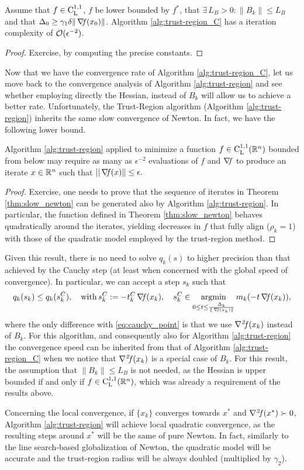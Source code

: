 \documentclass[10pt,a4paper]{article}
\begin{document}
\begin{theorem}
	Assume that $f\in \mathord{\mathrm{C^{1,1}_{L}}}$, $f$ be lower bounded by $f^*$, that $\exists\, L_B>0: \|B_k\| \leq L_B$ and that $\Delta_0\geq \gamma_1 \delta \|\operatorname*{\mathit{\nabla \!f}}(x_0)\|$. Algorithm \ref{alg:trust-region_C} has a iteration complexity of $\mathcal{O}(\epsilon^{-2})$.
\end{theorem}
\begin{proof}
	Exercise, by computing the precise constants.
\end{proof}
Now that we have the convergence rate of Algorithm \ref{alg:trust-region_C}, let us move back to the convergence analysis of Algorithm \ref{alg:trust-region} and see whether employing directly the Hessian, instead of $B_k$ will allow us to achieve a better rate. Unfortunately, the Trust-Region algorithm (Algorithm \ref{alg:trust-region}) inherits the same slow convergence of Newton. In fact, we have the following lower bound.

\begin{theorem}\label{thm:slow_trust_region}
	Algorithm \ref{alg:trust-region} applied to minimize a function $f\in \mathord{\mathrm{C^{1,1}_{L}}}(\mathbb{R}^n)$ bounded from below may require as many as $\epsilon^{-2}$ evaluations of $f$ and $\operatorname*{\mathit{\nabla \!f}}$ to produce an iterate $x\in \mathbb{R}^n$ such that $||\operatorname*{\mathit{\nabla \!f}} (x)\|\leq \epsilon.$
\end{theorem}
\begin{proof}
	Exercise, one needs to prove that the sequence of iterates in Theorem \ref{thm:slow_newton} can be generated also by Algorithm \ref{alg:trust-region}. In particular, the function defined in Theorem \ref{thm:slow_newton} behaves quadratically around the iterates, yielding decreases in $f$ that fully align ($\rho_k=1$) with those of the quadratic model employed by the trust-region method.
\end{proof}
Given this result, there is no need to solve $q_k(s)$ to higher precision than that achieved by the Cauchy step (at least when concerned with the global speed of convergence). In particular, we can accept a step $s_k$ such that 
\begin{equation*}
	q_k(s_k) \leq q_k(s_k^C), \quad \mathord{\mathrm{with }}\, s_k^C:= -t_k^C\operatorname*{\mathit{\nabla \!f}}(x_k), \quad s_k^C \in \operatorname*{argmin}_{0\leq t\leq \frac{\Delta_k}{\|\operatorname*{\mathit{\nabla \!f}}(x_k)\|}} m_k(-t\operatorname*{\mathit{\nabla \!f}}(x_k)),
\end{equation*}
where the only difference with \eqref{eq:cauchy_point} is that we use $\operatorname*{\mathit{\nabla^2 \!f}}(x_k)$ instead of $B_k$. For this algorithm, and consequently also for Algorithm \ref{alg:trust-region} the convergence speed can be inherited from that of Algorithm \ref{alg:trust-region_C} when we notice that $\operatorname*{\mathit{\nabla^2 \!f}}(x_k)$ is a special case of $B_k$. For this result, the assumption that $\|B_k\|\leq L_B$ is not needed, as the Hessian is upper bounded if and only if $f\in \mathord{\mathrm{C^{1,1}_{L}}}(\mathbb{R}^n)$, which was already a requirement of the results above. 

Concerning the local convergence, if $\{x_k\}$ converges towards $x^*$ and $\operatorname*{\mathit{\nabla^2 \!f}}(x^*)\succ0$, Algorithm \ref{alg:trust-region} will achieve local quadratic convergence, as the resulting steps around $x^*$ will be the same of pure Newton. In fact, similarly to the line search-based globalization of Newton, the quadratic model will be accurate and the trust-region radius will be always doubled (multiplied by $\gamma_2$).


\end{document}
